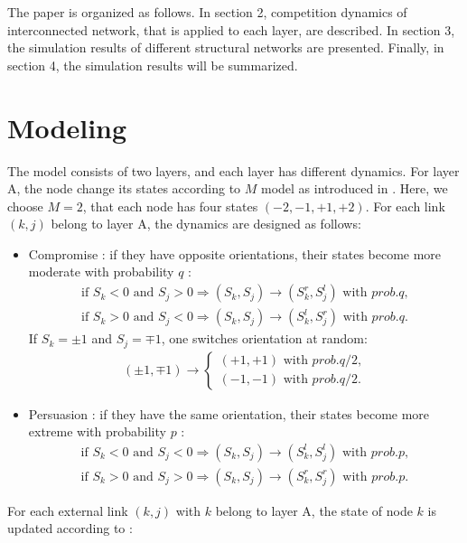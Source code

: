 \documentclass[english]{cccconf}
\begin{document}
The paper is organized as follows. In section 2, competition dynamics of interconnected network, that is applied to each layer, are described. In section 3, the simulation results of different structural networks are presented. Finally, in section 4, the simulation results will be summarized.

\section{Modeling}
The model consists of two layers, and each layer has different dynamics. For layer A, the node change its states according to $M$ model as introduced in \cite{rocca2014}. Here, we choose $M=2$, that each node has four states $(-2, -1, +1, +2)$. For each link $(k, j)$ belong to layer A,  the dynamics are designed as follows:
\begin{itemize}
\item Compromise : if they have opposite orientations, their states become more moderate with probability $q$ :
\begin{align*}
\mbox{if } S_k<0 \mbox{ and } S_j>0  \Rightarrow (S_k, S_j) \rightarrow (S_k^r, S_j^l) \mbox{ with } prob.q,\\
\mbox{if } S_k>0 \mbox{ and } S_j<0  \Rightarrow (S_k, S_j) \rightarrow (S_k^l, S_j^r) \mbox{ with } prob.q.
\end{align*}
If $S_k = \pm1$ and $S_j = \mp1$, one switches orientation at random:
\begin{align*}
(\pm 1, \mp 1)\rightarrow \left\{\begin{matrix}
(+1, +1) \mbox{ with } prob.q/2,
\\(-1, -1)\mbox{ with } prob.q/2.
\end{matrix}\right.
\end{align*}
\item Persuasion : if they have the same orientation, their states become more extreme with probability $p$ :
\begin{align*}
\mbox{if } S_k<0 \mbox{ and } S_j<0  \Rightarrow (S_k, S_j) \rightarrow (S_k^l, S_j^l) \mbox{ with } prob.p,\\
\mbox{if } S_k>0 \mbox{ and } S_j>0  \Rightarrow (S_k, S_j) \rightarrow (S_k^r, S_j^r) \mbox{ with } prob.p.
\end{align*}
\end{itemize}
For each external link $(k,j)$ with $k$ belong to layer A, the state of node $k$ is updated according to :
\end{document}
